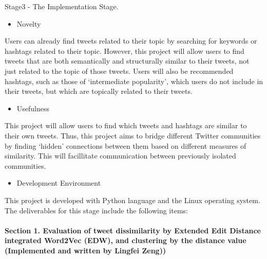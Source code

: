 \documentclass[10pt]{article}
\begin{document}
Stage3 - The Implementation Stage. \\

\begin{itemize}
	\item Novelty
\end{itemize}
Users can already find tweets related to their topic by searching for keywords or hashtags related to their topic. However, this project will allow users to find tweets that are both semantically and structurally similar to their tweets, not just related to the topic of those tweets. Users will also be recommended hashtags, such as those of ‘intermediate popularity’, which users do not include in their tweets, but which are topically related to their tweets.

\begin{itemize}
	\item Usefulness
\end{itemize}
This project will allow users to find which tweets and hashtags are similar to their own tweets. Thus, this project aims to bridge different Twitter communities by finding ‘hidden’ connections between them based on different measures of similarity. This will facillitate communication between previously isolated communities.
\begin{itemize}
	\item Development Environment
\end{itemize}	
This project is developed with Python language and the Linux operating system. \\
The deliverables for this stage include the following items:\\\\
{\bf Section 1. Evaluation of tweet dissimilarity by Extended Edit Distance integrated Word2Vec (EDW), and clustering by the distance value (Implemented and written by Lingfei Zeng)) }
\end{document}
